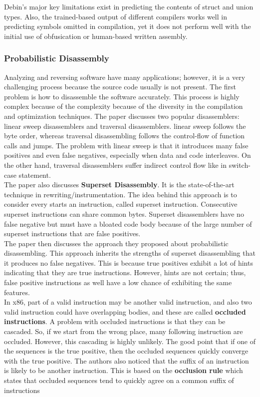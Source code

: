 \documentclass{article}
\begin{document}
Debin's major key limitations exist in predicting the contents of struct and union types. Also, the trained-based output of different compilers works well in predicting symbols omitted in compilation, yet it does not perform well with the initial use of obfusication or human-based written assembly.


\subsubsection{Probabilistic Disassembly}
Analyzing and reversing software have many applications; however, it is a very challenging process because the source code usually is not present. The first problem is how to disassemble the software accurately. This process is highly complex because of the complexity because of the diversity in the compilation and optimization techniques. The paper discusses two popular disassemblers: linear sweep disassemblers and traversal disassemblers. linear sweep follows the byte order, whereas traversal disassembling follows the control-flow of function calls and jumps. The problem with linear sweep is that it introduces many false positives and even false negatives, especially when data and code interleaves. On the other hand, traversal disassemblers suffer indirect control flow like in switch-case statement. \\

\noindent The paper also discusses \textbf{Superset Disassembly}. It is the state-of-the-art technique in rewriting/instrumentation. The idea behind this approach is to consider every starts an instruction, called superset instruction. Consecutive superset instructions can share common bytes. Superset disassemblers have no false negative but must have a bloated code body because of the large number of superset instructions that are false positives.\\

\noindent The paper then discusses the approach they proposed about probabilistic disassembling. This approach inherits the strengths of superset disassembling that it produces no false negatives. This is because true positives exhibit a lot of hints indicating that they are true instructions. However, hints are not certain; thus, false positive instructions as well have a low chance of exhibiting the same features. \\

\noindent In x86, part of a valid instruction may be another valid instruction, and also two valid instruction could have overlapping bodies, and these are called \textbf{occluded instructions}. A problem with occluded instructions is that they can be cascaded. So, if we start from the wrong place, many following instruction are occluded. However, this cascading is highly unlikely. The good point that if one of the sequences is the true positive, then the occluded sequences quickly converge with the true positive. The authors also noticed that the suffix of an instruction is likely to be another instruction. This is based on the \textbf{occlusion rule} which states that occluded sequences tend to quickly agree on a common suffix of instructions\\
\end{document}
